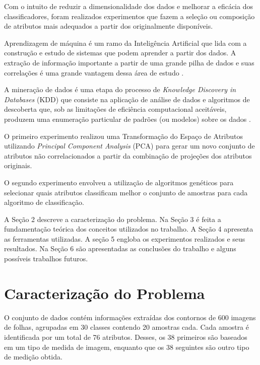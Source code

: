 \documentclass[conference]{IEEEtran}
\begin{document}
Com o intuito de reduzir a dimensionalidade dos dados e melhorar a eficácia dos classificadores, foram realizados experimentos que fazem a seleção ou composição de atributos mais adequados a partir dos originalmente disponíveis. 

Aprendizagem de máquina é um ramo da Inteligência Artificial que lida com a construção e estudo de sistemas que podem aprender a partir dos dados. A extração de informação importante a partir de uma grande pilha de dados e suas correlações é uma grande vantagem dessa área de estudo \cite{IEEEhowto:fauzi}.

A mineração de dados é uma etapa do processo de {\it Knowledge Discovery in Databases} (KDD) que consiste na aplicação de análise de dados e algoritmos de descoberta que, sob as limitações de eficiência computacional aceitáveis, produzem uma enumeração particular de padrões (ou modelos) sobre os dados \cite{IEEEhowto:fayyad}.

O primeiro experimento realizou uma Transformação do Espaço de Atributos utilizando {\it Principal Component Analysis} (PCA) para gerar um novo conjunto de atributos não correlacionados a partir da combinação de projeções dos atributos originais.

O segundo experimento envolveu a utilização de algoritmos genéticos para selecionar quais atributos classificam melhor o conjunto de amostras para cada algoritmo de classificação. 

A Seção 2 descreve a caracterização do problema. Na Seção 3 é feita a fundamentação teórica dos conceitos utilizados no trabalho. A Seção 4 apresenta as ferramentas utilizadas. A seção 5 engloba os experimentos realizados e seus resultados. Na Seção 6 são apresentadas as conclusões do trabalho e alguns possíveis trabalhos futuros. 



\section{Caracterização do Problema}

O conjunto de dados contém informações extraídas dos contornos de 600 imagens de folhas, agrupadas em 30 classes contendo 20 amostras cada. Cada amostra é identificada por um total de 76 atributos. Desses, os 38 primeiros são baseados em um tipo de medida de imagem, enquanto que os 38 seguintes são outro tipo de medição obtida.
\end{document}
